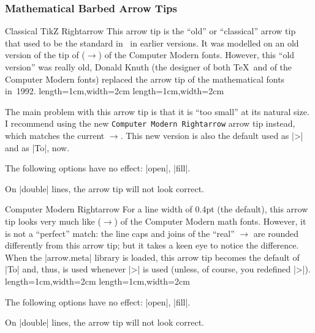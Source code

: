 \subsubsection{Mathematical Barbed Arrow Tips}

\begin{arrowtip}{Classical TikZ Rightarrow}{
    This arrow tip is the ``old'' or ``classical'' arrow tip that used to be
    the standard in \tikzname\ in earlier versions. It was modelled on an old
    version of the tip of \texttt{\string\rightarrow} ($\rightarrow$) of the
    Computer Modern fonts. However, this ``old version'' was really old, Donald
    Knuth (the designer of both \TeX\ and of the Computer Modern fonts)
    replaced the arrow tip of the mathematical fonts in~1992.
}%
{length=1cm,width=2cm}%
{length=1cm,width=2cm}

    The main problem with this arrow tip is that it is ``too small'' at its
    natural size. I recommend using the new \texttt{Computer Modern Rightarrow}
    arrow tip instead, which matches the current $\to$. This new version is
    also the default used as |>| and as |To|, now.
    \begin{arrowexamples}
        \arrowexample[]
        \arrowexampledup[sep]
        \arrowexampledupdot[sep]
        \arrowexample[length=3pt]
        \arrowexample[sharp]
        \arrowexample[slant=.3]
        \arrowexample[left]
        \arrowexample[right]
        \arrowexample[red]
    \end{arrowexamples}
    The following options have no effect: |open|, |fill|.

    On |double| lines, the arrow tip will not look correct.
\end{arrowtip}

\begin{arrowtip}{Computer Modern Rightarrow}{
    For a line width of 0.4pt (the default), this arrow tip looks very much
    like \texttt{\string\rightarrow} ($\to$) of the Computer Modern math fonts.
    However, it is not a ``perfect'' match: the line caps and joins of the
    ``real'' $\to$ are rounded differently from this arrow tip; but it takes a
    keen eye to notice the difference. When the |arrow.meta| library is loaded,
    this arrow tip becomes the default of |To| and, thus, is used whenever |>|
    is used (unless, of course, you redefined |>|).
}%
{length=1cm,width=2cm}%
{length=1cm,width=2cm}

    \begin{arrowexamples}
        \arrowexample[]
        \arrowexampledup[sep]
        \arrowexampledupdot[sep]
        \arrowexample[length=3pt]
        \arrowexample[sharp]
        \arrowexample[slant=.3]
        \arrowexample[left]
        \arrowexample[right]
        \arrowexample[red]
    \end{arrowexamples}
    The following options have no effect: |open|, |fill|.

    On |double| lines, the arrow tip will not look correct.
\end{arrowtip}

